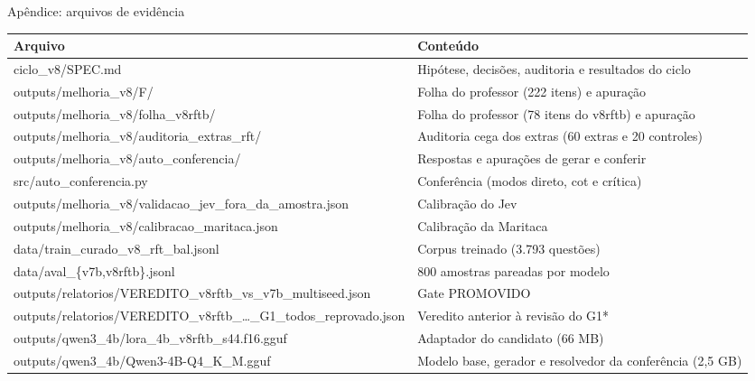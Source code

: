 \documentclass[aspectratio=169,11pt]{beamer}
\begin{document}
\appendix
\begin{frame}{Apêndice: arquivos de evidência}
  \tiny
  \begin{tabularx}{\textwidth}{@{}>{\ttfamily}lX@{}}
    \toprule
    Arquivo & Conteúdo \\
    \midrule
    ciclo\_v8/SPEC.md & Hipótese, decisões, auditoria e resultados do ciclo \\
    outputs/melhoria\_v8/F/ & Folha do professor (222 itens) e apuração \\
    outputs/melhoria\_v8/folha\_v8rftb/ & Folha do professor (78 itens do v8rftb) e apuração \\
    outputs/melhoria\_v8/auditoria\_extras\_rft/ & Auditoria cega dos extras (60 extras e 20 controles) \\
    outputs/melhoria\_v8/auto\_conferencia/ & Respostas e apurações de gerar e conferir \\
    src/auto\_conferencia.py & Conferência (modos direto, cot e crítica) \\
    outputs/melhoria\_v8/validacao\_jev\_fora\_da\_amostra.json & Calibração do Jev \\
    outputs/melhoria\_v8/calibracao\_maritaca.json & Calibração da Maritaca \\
    data/train\_curado\_v8\_rft\_bal.jsonl & Corpus treinado (3.793 questões) \\
    data/aval\_\{v7b,v8rftb\}.jsonl & 800 amostras pareadas por modelo \\
    outputs/relatorios/VEREDITO\_v8rftb\_vs\_v7b\_multiseed.json & Gate PROMOVIDO \\
    outputs/relatorios/VEREDITO\_v8rftb\_\dots\_G1\_todos\_reprovado.json & Veredito anterior à revisão do G1* \\
    outputs/qwen3\_4b/lora\_4b\_v8rftb\_s44.f16.gguf & Adaptador do candidato (66 MB) \\
    outputs/qwen3\_4b/Qwen3-4B-Q4\_K\_M.gguf & Modelo base, gerador e resolvedor da conferência (2,5 GB) \\
    \bottomrule
  \end{tabularx}
\end{frame}
\end{document}
